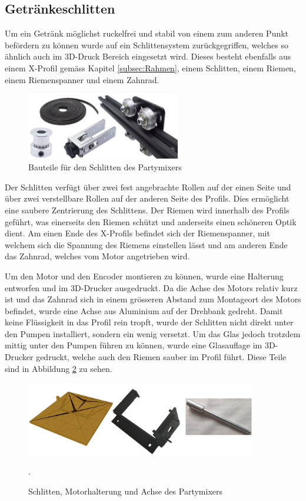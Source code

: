\subsection{Getränkeschlitten}
\label{subsec:Getränkeschlitten}

Um ein Getränk möglichst ruckelfrei und stabil von einem zum anderen Punkt befördern zu können wurde auf ein Schlittensystem zurückgegriffen, welches so ähnlich auch im 3D-Druck Bereich eingesetzt wird. Dieses besteht ebenfalls aus einem X-Profil gemäss Kapitel \ref{subsec:Rahmen}, einem Schlitten, einem Riemen, einem Riemenspanner und einem Zahnrad. 

\begin{figure}[H]
	\centering
	\includegraphics[width=0.6\textwidth]{graphics/Schlitten}
	\caption{Bauteile für den Schlitten des Partymixers \cite{shop4649026_store_2020_nodate} \cite{super_3d_technology_co_limited_2020_nodate} \cite{super_3d_technology_co_limited_1set_nodate} \cite{super_3d_technology_co_limited_2gtgt2_nodate}}
	\label{fig:Schlitten}
\end{figure}

Der Schlitten verfügt über zwei fest angebrachte Rollen auf der einen Seite und über zwei verstellbare Rollen auf der anderen Seite des Profils. Dies ermöglicht eine saubere Zentrierung des Schlittens. Der Riemen wird innerhalb des Profils geführt, was einerseits den Riemen schützt und anderseits einen schöneren Optik dient. Am einen Ende des X-Profils befindet sich der Riemenspanner, mit welchem sich die Spannung des Riemens einstellen lässt und am anderen Ende das Zahnrad, welches vom Motor angetrieben wird. 

Um den Motor und den Encoder montieren zu können, wurde eine Halterung entworfen und im 3D-Drucker ausgedruckt. Da die Achse des Motors relativ kurz ist und das Zahnrad sich in einem grösseren Abstand zum Montageort des Motors befindet, wurde eine Achse aus Aluminium auf der Drehbank gedreht.  Damit keine Flüssigkeit in das Profil rein tropft, wurde der Schlitten nicht direkt unter den Pumpen installiert, sondern ein wenig versetzt. Um das Glas jedoch trotzdem mittig unter den Pumpen führen zu können, wurde eine Glasauflage im 3D-Drucker gedruckt, welche auch den Riemen sauber im Profil führt. Diese Teile sind in Abbildung \ref{fig:Motorhalterung} zu sehen.    

\begin{figure}[H]
	\centering
	\includegraphics[width=0.9\textwidth]{graphics/Motorhalterung}
	\caption{Schlitten, Motorhalterung und Achse des Partymixers}.
	\label{fig:Motorhalterung}
\end{figure} 